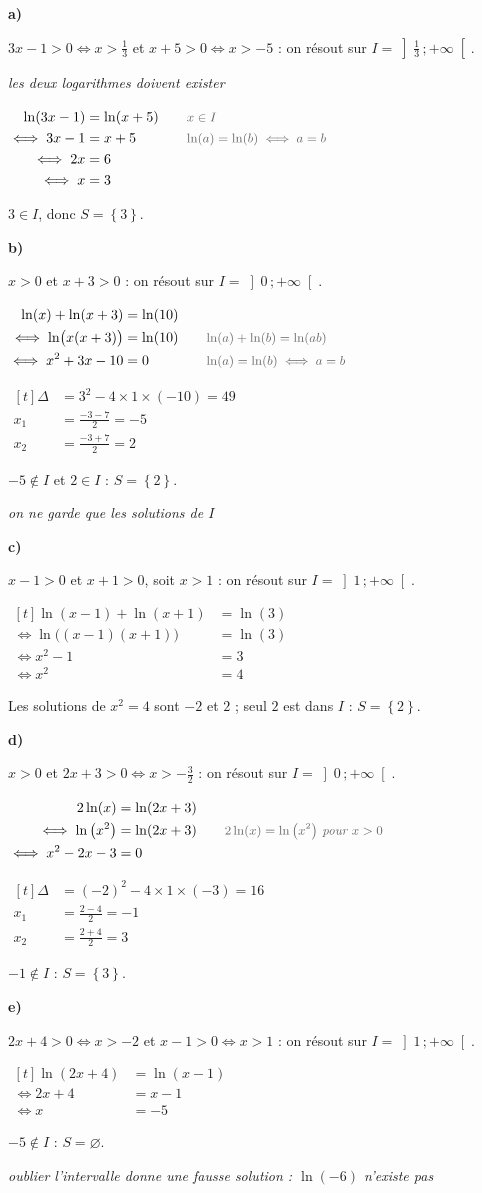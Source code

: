 \documentclass[11pt,a4paper]{article}
\makeatletter
\newcommand{\lycee@intoo}[2]{\left]#1\,;#2\right[}
\newcommand{\lycee@ens}[1]{\left\{#1\right\}}
\providecommand{\intoo}{\lycee@intoo}%
\providecommand{\ens}{\lycee@ens}}
\newcounter{exo}
\newenvironment{exo}[1][\relax]{\refstepcounter{exo}\begin{exercice}[#1]}{\end{exercice}}
\newcommand{\res}[1]{{\color{coulRep}#1}}
\newenvironment{calculs}{\par\smallskip\noindent$\displaystyle\begin{aligned}[t]}%
  {\end{aligned}$\par\smallskip}
\newcommand{\justif}[1]{\quad\text{\small\itshape\color{black!60}#1}}
\newcommand{\cas}[1]{\par\smallskip\noindent\textbf{\color{coulExo}#1}\vadjust{\nobreak}}
\newcommand{\explique}[2]{\par\smallskip\noindent
  \begin{minipage}[t]{0.6\linewidth}\raggedright #1\end{minipage}\hfill
  \begin{minipage}[t]{0.37\linewidth}\raggedright\leavevmode
    {\small\itshape\color{black!60}#2}\end{minipage}\par}
\let\casligne\cas
\renewcommand{\cas}[1]{\casligne{#1}\par\nopagebreak}
\makeatother
\begin{document}
\begin{exo}[Équations]
\cas{a)}
\explique{$3x-1>0\iff x>\frac{1}{3}$ et $x+5>0\iff x>-5$ : on résout sur
$I=\intoo{\frac{1}{3}}{+\infty}$.}{les deux logarithmes doivent exister}
\begin{calculs}
\ln(3x-1) &= \ln(x+5) &&\justif{$x\in I$}\\
\iff 3x-1 &= x+5 &&\justif{$\ln(a)=\ln(b)\iff a=b$}\\
\iff 2x &= 6 &&\\
\iff x &= 3 &&
\end{calculs}
\explique{$3\in I$, donc \res{$S=\ens{3}$}.}{}
\cas{b)}
\explique{$x>0$ et $x+3>0$ : on résout sur $I=\intoo{0}{+\infty}$.}{}
\begin{calculs}
\ln(x)+\ln(x+3) &= \ln(10) &&\\
\iff \ln\bigl(x(x+3)\bigr) &= \ln(10) &&\justif{$\ln(a)+\ln(b)=\ln(ab)$}\\
\iff x^{2}+3x-10 &= 0 &&\justif{$\ln(a)=\ln(b)\iff a=b$}
\end{calculs}
\begin{calculs}
\Delta &= 3^{2}-4\times 1\times(-10) = 49 &&\\
x_{1} &= \frac{-3-7}{2} = -5 &&\\
x_{2} &= \frac{-3+7}{2} = 2 &&
\end{calculs}
\explique{$-5\notin I$ et $2\in I$ : \res{$S=\ens{2}$}.}{on ne garde que les solutions de $I$}
\cas{c)}
\explique{$x-1>0$ et $x+1>0$, soit $x>1$ : on résout sur $I=\intoo{1}{+\infty}$.}{}
\begin{calculs}
\ln(x-1)+\ln(x+1) &= \ln(3) &&\\
\iff \ln\bigl((x-1)(x+1)\bigr) &= \ln(3) &&\\
\iff x^{2}-1 &= 3 &&\\
\iff x^{2} &= 4 &&
\end{calculs}
\explique{Les solutions de $x^{2}=4$ sont $-2$ et $2$ ; seul $2$ est dans $I$ :
\res{$S=\ens{2}$}.}{}
\cas{d)}
\explique{$x>0$ et $2x+3>0\iff x>-\frac{3}{2}$ : on résout sur $I=\intoo{0}{+\infty}$.}{}
\begin{calculs}
2\ln(x) &= \ln(2x+3) &&\\
\iff \ln\left(x^{2}\right) &= \ln(2x+3) &&\justif{$2\ln(x)=\ln\left(x^{2}\right)$ pour $x>0$}\\
\iff x^{2}-2x-3 &= 0 &&
\end{calculs}
\begin{calculs}
\Delta &= (-2)^{2}-4\times 1\times(-3) = 16 &&\\
x_{1} &= \frac{2-4}{2} = -1 &&\\
x_{2} &= \frac{2+4}{2} = 3 &&
\end{calculs}
\explique{$-1\notin I$ : \res{$S=\ens{3}$}.}{}
\cas{e)}
\explique{$2x+4>0\iff x>-2$ et $x-1>0\iff x>1$ : on résout sur $I=\intoo{1}{+\infty}$.}{}
\begin{calculs}
\ln(2x+4) &= \ln(x-1) &&\\
\iff 2x+4 &= x-1 &&\\
\iff x &= -5 &&
\end{calculs}
\explique{$-5\notin I$ : \res{$S=\varnothing$}.}{oublier l'intervalle donne une
fausse solution : $\ln(-6)$ n'existe pas}
\end{exo}
\end{document}
